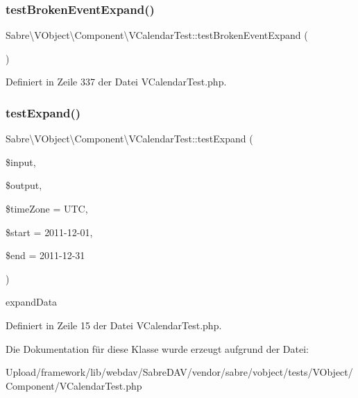 \subsubsection{\texorpdfstring{test\+Broken\+Event\+Expand()}{testBrokenEventExpand()}}
{\footnotesize\ttfamily Sabre\textbackslash{}\+V\+Object\textbackslash{}\+Component\textbackslash{}\+V\+Calendar\+Test\+::test\+Broken\+Event\+Expand (\begin{DoxyParamCaption}{ }\end{DoxyParamCaption})}



Definiert in Zeile 337 der Datei V\+Calendar\+Test.\+php.

\mbox{\label{class_sabre_1_1_v_object_1_1_component_1_1_v_calendar_test_a0696d1d6ce5c1529149793704dc75d4d}} 
\subsubsection{\texorpdfstring{test\+Expand()}{testExpand()}}
{\footnotesize\ttfamily Sabre\textbackslash{}\+V\+Object\textbackslash{}\+Component\textbackslash{}\+V\+Calendar\+Test\+::test\+Expand (\begin{DoxyParamCaption}\item[{}]{\$input,  }\item[{}]{\$output,  }\item[{}]{\$time\+Zone = {\ttfamily \textquotesingle{}UTC\textquotesingle{}},  }\item[{}]{\$start = {\ttfamily \textquotesingle{}2011-\/12-\/01\textquotesingle{}},  }\item[{}]{\$end = {\ttfamily \textquotesingle{}2011-\/12-\/31\textquotesingle{}} }\end{DoxyParamCaption})}

expand\+Data 

Definiert in Zeile 15 der Datei V\+Calendar\+Test.\+php.



Die Dokumentation für diese Klasse wurde erzeugt aufgrund der Datei\+:\begin{DoxyCompactItemize}
\item 
Upload/framework/lib/webdav/\+Sabre\+D\+A\+V/vendor/sabre/vobject/tests/\+V\+Object/\+Component/V\+Calendar\+Test.\+php\end{DoxyCompactItemize}
